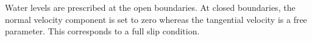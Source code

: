 Water levels are prescribed at the open boundaries. At closed boundaries,
the normal velocity component is set to zero whereas the tangential velocity
is a free parameter. This corresponds to a full slip condition.







